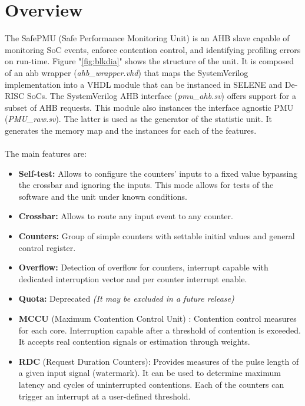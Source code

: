 \newpage
\section{Overview}
\label{chapter1}
The SafePMU (Safe Performance Monitoring  Unit) is an AHB slave capable of monitoring SoC events, enforce contention control, and identifying profiling errors on run-time.
Figure "\ref{fig:blkdia}" shows the structure of the unit. It is composed of an ahb wrapper (\textit{ahb\_wrapper.vhd}) that maps the SystemVerilog implementation into a VHDL module that can be instanced in SELENE and De-RISC SoCs.  The SystemVerilog AHB interface (\textit{pmu\_ahb.sv}) offers support for a subset of AHB requests. This module also instances the interface agnostic PMU (\textit{PMU\_raw.sv}). The latter is used as the generator of the statistic unit. It generates the memory map and the instances for each of the features.\\
\\
The main features are:\\
\begin{itemize}
	\item \textbf{Self-test:} Allows to configure the counters' inputs to a fixed value bypassing the crossbar and ignoring the inputs. This mode allows for tests of the software and the unit under known conditions.
	\item \textbf{Crossbar:} Allows to route any input event to any counter.
	\item \textbf{Counters:} Group of simple counters with settable initial values and general control register.
	\item \textbf{Overflow:} Detection of overflow for counters, interrupt capable with dedicated interruption vector and per counter interrupt enable.
	\item \textbf{Quota:} Deprecated \textit{(It may be excluded in a future release)}
	\item \textbf{MCCU }(Maximum Contention Control Unit) : Contention control measures for each core. Interruption capable after a threshold of contention is exceeded. It accepts real contention signals or estimation through weights.
	\item \textbf{RDC }(Request Duration Counters): Provides measures of the pulse length of a given input signal (watermark). It can be used to determine maximum latency and cycles of uninterrupted contentions. Each of the counters can trigger an interrupt at a user-defined threshold.
\end{itemize}

